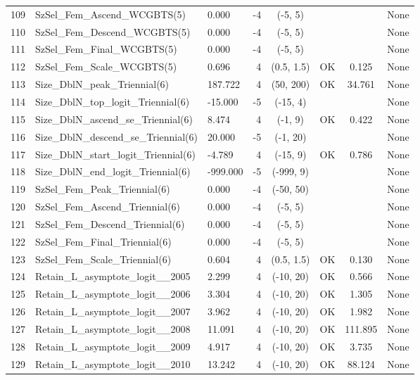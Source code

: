 \documentclass[12pt,]{article}
\begin{document}
\begin{landscape}
\begin{longtable}{lp{2.5in}lrcccl}
  109 & SzSel\_Fem\_Ascend\_WCGBTS(5) & 0.000 & -4 & (-5, 5) &  &  & None \\ 
  110 & SzSel\_Fem\_Descend\_WCGBTS(5) & 0.000 & -4 & (-5, 5) &  &  & None \\ 
  111 & SzSel\_Fem\_Final\_WCGBTS(5) & 0.000 & -4 & (-5, 5) &  &  & None \\ 
  112 & SzSel\_Fem\_Scale\_WCGBTS(5) & 0.696 & 4 & (0.5, 1.5) & OK & 0.125 & None \\ 
  113 & Size\_DblN\_peak\_Triennial(6) & 187.722 & 4 & (50, 200) & OK & 34.761 & None \\ 
  114 & Size\_DblN\_top\_logit\_Triennial(6) & -15.000 & -5 & (-15, 4) &  &  & None \\ 
  115 & Size\_DblN\_ascend\_se\_Triennial(6) & 8.474 & 4 & (-1, 9) & OK & 0.422 & None \\ 
  116 & Size\_DblN\_descend\_se\_Triennial(6) & 20.000 & -5 & (-1, 20) &  &  & None \\ 
  117 & Size\_DblN\_start\_logit\_Triennial(6) & -4.789 & 4 & (-15, 9) & OK & 0.786 & None \\ 
  118 & Size\_DblN\_end\_logit\_Triennial(6) & -999.000 & -5 & (-999, 9) &  &  & None \\ 
  119 & SzSel\_Fem\_Peak\_Triennial(6) & 0.000 & -4 & (-50, 50) &  &  & None \\ 
  120 & SzSel\_Fem\_Ascend\_Triennial(6) & 0.000 & -4 & (-5, 5) &  &  & None \\ 
  121 & SzSel\_Fem\_Descend\_Triennial(6) & 0.000 & -4 & (-5, 5) &  &  & None \\ 
  122 & SzSel\_Fem\_Final\_Triennial(6) & 0.000 & -4 & (-5, 5) &  &  & None \\ 
  123 & SzSel\_Fem\_Scale\_Triennial(6) & 0.604 & 4 & (0.5, 1.5) & OK & 0.130 & None \\ 
  124 & Retain\_L\_asymptote\_logit\_\_2005 & 2.299 & 4 & (-10, 20) & OK & 0.566 & None \\ 
  125 & Retain\_L\_asymptote\_logit\_\_2006 & 3.304 & 4 & (-10, 20) & OK & 1.305 & None \\ 
  126 & Retain\_L\_asymptote\_logit\_\_2007 & 3.962 & 4 & (-10, 20) & OK & 1.982 & None \\ 
  127 & Retain\_L\_asymptote\_logit\_\_2008 & 11.091 & 4 & (-10, 20) & OK & 111.895 & None \\ 
  128 & Retain\_L\_asymptote\_logit\_\_2009 & 4.917 & 4 & (-10, 20) & OK & 3.735 & None \\ 
  129 & Retain\_L\_asymptote\_logit\_\_2010 & 13.242 & 4 & (-10, 20) & OK & 88.124 & None \\ 

\end{longtable}
\end{landscape}
\end{document}
